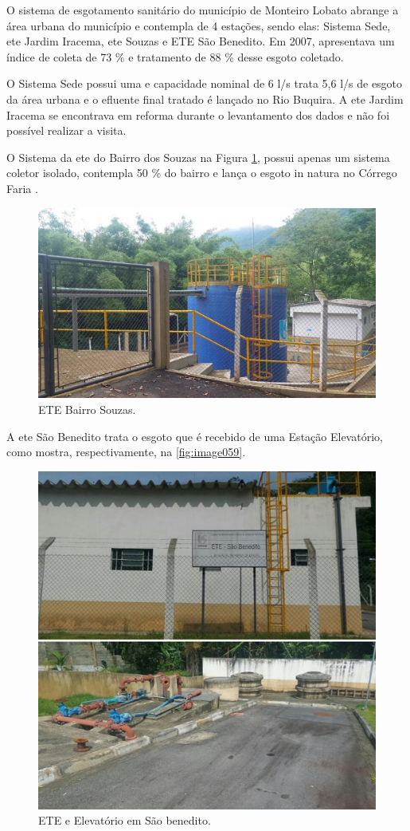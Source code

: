 	O sistema de esgotamento sanitário do município de Monteiro Lobato abrange a área urbana do município e contempla de 4 estações, sendo elas: Sistema Sede, \gls{ete} Jardim Iracema, \gls{ete} Souzas e ETE São Benedito. Em 2007, apresentava um índice de coleta de 73 \% e tratamento de 88 \% desse esgoto coletado. 

	O Sistema Sede possui uma e capacidade nominal de 6 l/s trata 5,6 l/s de esgoto da área urbana e o efluente final tratado é lançado no Rio Buquira. A \gls{ete} Jardim Iracema se encontrava em reforma durante o levantamento dos dados e não foi possível realizar a visita. 
	
	O Sistema da \gls{ete} do Bairro dos Souzas na Figura \ref{fig:image058}, possui apenas um sistema coletor isolado, contempla 50 \% do bairro e lança o esgoto in natura no Córrego Faria \cite{MonteiroLobato}. 
	
	\begin{figure}
		\centering
		\includegraphics[width=0.75\linewidth]{produtos/prodtres/image058}
		\caption{ETE Bairro Souzas.}
		\label{fig:image058}
	\end{figure}
	
	
	A \gls{ete} São Benedito trata o esgoto que é recebido de uma Estação Elevatório, como mostra, respectivamente, na \autoref{fig:image059}. 
	
	\begin{figure}
		\centering
		\includegraphics[width=0.75\linewidth]{produtos/prodtres/image059}
		\caption{ETE e Elevatório em São benedito.}
		\label{fig:image059}
	\end{figure}
	
